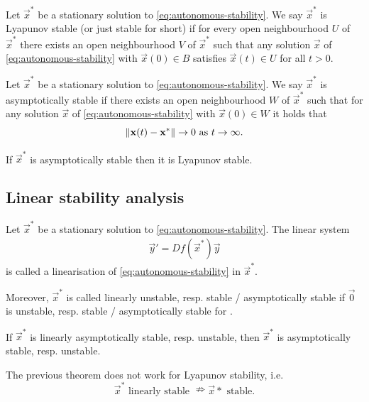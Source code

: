 \begin{dfn}
   Let $\vec{x}^*$ be a stationary solution to
  \ref{eq:autonomous-stability}. We say $\vec{x}^*$ is Lyapunov stable (or just
  stable for short) if for every open neighbourhood $U$ of $\vec{x}^*$ there
  exists an open neighbourhood $V$ of $\vec{x}^*$ such that any solution
  $\vec{x}$ of \ref{eq:autonomous-stability} with $\vec{x}(0) \in B$ satisfies
  $\vec{x}(t) \in U$ for all $t > 0$.
\end{dfn}

\begin{dfn}

  Let $\vec{x}^*$ be a stationary solution to \ref{eq:autonomous-stability}. We
  say $\vec{x}^*$ is asymptotically stable if there exists an open
  neighbourhood $W$ of $\vec{x}^*$ such that for any solution $\vec{x}$ of
  \ref{eq:autonomous-stability} with $\vec{x}(0) \in W$ it holds that
  \[
    \left\Vert{\mathbf{x}(t) - \mathbf{x}^*}\right\Vert \to 0 \text{ as } t \to \infty.
  \]
\end{dfn}

\begin{remark}
  If $\vec{x}^*$ is asymptotically stable then it is Lyapunov stable.
\end{remark}

\subsection{Linear stability analysis}

\begin{dfn}
  Let $\vec{x}^*$ be a stationary solution to \ref{eq:autonomous-stability}.
  The linear system
  \begin{align}
    \label{eq:linear-system-stability}
    \vec{y}' = Df(\vec{x}^*)\vec{y}
  \end{align}
  is called a linearisation of \ref{eq:autonomous-stability} in $\vec{x}^*$.

  Moreover, $\vec{x}^*$ is called linearly unstable, resp. stable /
  asymptotically stable if $\vec{0}$ is unstable, resp. stable / asymptotically
  stable for \label{eq:linear-system-stability}.
\end{dfn}

\begin{thm}

  If $\vec{x}^*$ is linearly asymptotically stable, resp. unstable, then
  $\vec{x}^*$ is asymptotically stable, resp. unstable.
\end{thm}

\begin{remark}
  The previous theorem does not work for Lyapunov stability, i.e.
  \[
    \vec{x}^* \text{ linearly stable } \nRightarrow \vec{x}* \text{ stable}.
  \]
\end{remark}


